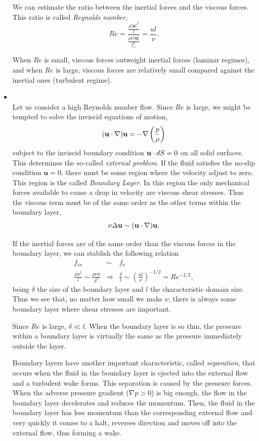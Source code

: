 \begin{itemize}
We can estimate the ratio between the inertial forces and the viscous forces. This ratio is called \textit{Reynolds number},
$$Re=\frac{\frac{\rho |\mathbf{u}|^2}{l}}{\frac{\rho\nu|\mathbf{u}|}{l_\bot^2}}=\frac{ul}{\nu}.$$

When $ Re $ is small, viscous forces outweight inertial forces (laminar regimes), and when $ Re $ is large, viscous forces are relatively small compared against the inertial ones (turbulent regime).

\item{}\\ Let us consider a high Reynolds number flow. Since $Re$ is large, we might be tempted to solve the inviscid equations of motion, 
$$({\bf u}\cdot\nabla){\bf u}=-\nabla\left(\frac{p}{\rho}\right)$$
subject to the inviscid boundary condition ${\bf u}\cdot dS=0$ on all solid surfaces. This determines the so-called \textit{external problem}. If the fluid satisfies the no-slip condition $\mathbf{u}=0$, there must be some region where the velocity adjust to zero. This region is the called \textit{Boundary Layer}. In this region the only mechanical forces available to cause a drop in velocity are viscous shear stresses. Thus the viscous term must be of the same order as the other terms within the boundary layer, 
$$\nu\Delta{\bf u}\sim({\bf u}\cdot\nabla){\bf u},$$

If the inertial forces are of the same order than the viscous forces in the boundary layer, we can stablish the following relation
\begin{eqnarray*}
f_{in}&\sim& f_\nu\\
\frac{\rho u^2}{l} \sim\frac{\rho\nu u}{\delta^2} &\Rightarrow& \frac{\delta}{l}\sim\left(\frac{ul}{\nu}\right)^{-1/2}=Re^{-1/2},
\end{eqnarray*}
being $\delta$ the size of the boundary layer and $l$ the characteristic domain size. Thus we see that, no matter how small we make $\nu$, there is always some boundary layer where shear stresses are important.

Since $Re$ is large, $\delta\ll l.$ When the boundary layer is so thin, the pressure within a boundary layer is virtually the same as the pressure immediately outside the layer.

Boundary layers have another important characteristic, called \textit{separation}, that occurs when the fluid in the boundary layer is ejected into the external flow and a turbulent wake forms. This separation is caused by the pressure forces. When the adverse pressure gradient ($\nabla p>0$) is big enough, the flow in the boundary layer decelerates and reduces the momentum. Then, the fluid in the boundary layer has less momentum than the corresponding external flow and very quickly it comes to a halt, reverses direction and moves off into the external flow, thus forming a wake.


\end{itemize}
